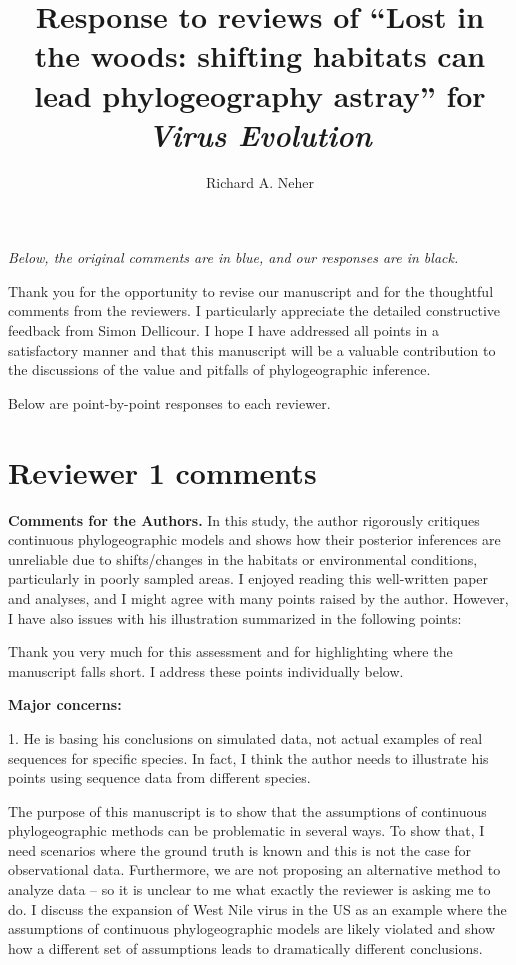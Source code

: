 \documentclass[11pt, oneside]{article}   	%
\title{Response to reviews of ``Lost in the woods: shifting habitats can lead phylogeography astray'' for \textit{Virus Evolution}}
\author{
Richard A. Neher
}
\newcommand{\response}[1]{{\color{black}{\bf Response:} #1}}
\begin{document}
\maketitle

\emph{Below, the original comments {\color{blue} are in blue}, and our responses are in black.}

\color{blue}

\response{
Thank you for the opportunity to revise our manuscript and for the thoughtful comments from the reviewers.
I particularly appreciate the detailed constructive feedback from Simon Dellicour.
I hope I have addressed all points in a satisfactory manner and that this manuscript will be a valuable contribution to the discussions of the value and pitfalls of phylogeographic inference.

Below are point-by-point responses to each reviewer.
}

\section*{Reviewer 1 comments}

{\bf Comments for the Authors.}
In this study, the author rigorously critiques continuous phylogeographic models and shows how their posterior inferences are unreliable due to shifts/changes in the habitats or environmental conditions, particularly in poorly sampled areas. I enjoyed reading this well-written paper and analyses, and I might agree with many points raised by the author. However, I have also issues with his illustration summarized in the following points:

\response{Thank you very much for this assessment and for highlighting where the manuscript falls short. I address these points individually below.}


{\bf Major concerns:}

1. He is basing his conclusions on simulated data, not actual examples of real sequences for specific species. In fact, I think the author needs to illustrate his points using sequence data from different species.

\response{The purpose of this manuscript is to show that the assumptions of continuous phylogeographic methods can be problematic in several ways. To show that, I need scenarios where the ground truth is known and this is not the case for observational data.
Furthermore, we are not proposing an alternative method to analyze data -- so it is unclear to me what exactly the reviewer is asking me to do.
I discuss the expansion of West Nile virus in the US as an example where the assumptions of continuous phylogeographic models are likely violated and show how a different set of assumptions leads to dramatically different conclusions.
}
\end{document}
